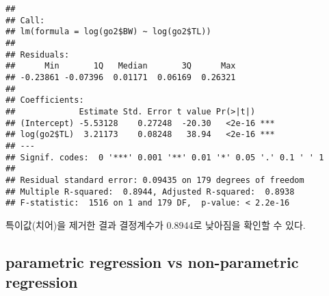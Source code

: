\documentclass[
]{article}
\newenvironment{Shaded}{\begin{snugshade}}{\end{snugshade}}
\newcommand{\AttributeTok}[1]{\textcolor[rgb]{0.77,0.63,0.00}{#1}}
\newcommand{\DecValTok}[1]{\textcolor[rgb]{0.00,0.00,0.81}{#1}}
\newcommand{\FloatTok}[1]{\textcolor[rgb]{0.00,0.00,0.81}{#1}}
\newcommand{\FunctionTok}[1]{\textcolor[rgb]{0.00,0.00,0.00}{#1}}
\newcommand{\NormalTok}[1]{#1}
\newcommand{\SpecialCharTok}[1]{\textcolor[rgb]{0.00,0.00,0.00}{#1}}
\newcommand{\StringTok}[1]{\textcolor[rgb]{0.31,0.60,0.02}{#1}}
\begin{document}
\begin{Shaded}
\end{Shaded}

\begin{Shaded}
\end{Shaded}

\begin{verbatim}
## 
## Call:
## lm(formula = log(go2$BW) ~ log(go2$TL))
## 
## Residuals:
##      Min       1Q   Median       3Q      Max 
## -0.23861 -0.07396  0.01171  0.06169  0.26321 
## 
## Coefficients:
##             Estimate Std. Error t value Pr(>|t|)    
## (Intercept) -5.53128    0.27248  -20.30   <2e-16 ***
## log(go2$TL)  3.21173    0.08248   38.94   <2e-16 ***
## ---
## Signif. codes:  0 '***' 0.001 '**' 0.01 '*' 0.05 '.' 0.1 ' ' 1
## 
## Residual standard error: 0.09435 on 179 degrees of freedom
## Multiple R-squared:  0.8944, Adjusted R-squared:  0.8938 
## F-statistic:  1516 on 1 and 179 DF,  p-value: < 2.2e-16
\end{verbatim}

특이값(치어)을 제거한 결과 결정계수가 0.8944로 낮아짐을 확인할 수 있다.

\hypertarget{parametric-regression-vs-non-parametric-regression}{%
\subsection{parametric regression vs non-parametric
regression}\label{parametric-regression-vs-non-parametric-regression}}
\end{document}
